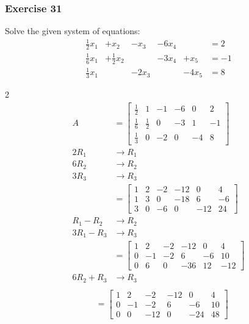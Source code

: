 \documentclass{math}
\begin{document}
\subsubsection*{Exercise 31}
Solve the given system of equations:
\[ \begin{alignedat}{4}
  \frac{1}{2}x_1 &+x_2 &-x_3 &-6x_4 & &= 2 \\
  \frac{1}{6}x_1 &+\frac{1}{2}x_2 & &-3x_4 &+x_5 &= -1 \\
  \frac{1}{3}x_1 & &-2x_3 & &-4x_5 &= 8
\end{alignedat} \]
\newpage
\begingroup
\renewcommand*{\arraystretch}{1.5}
\begin{multicols}{2}
  \begin{align*}
    A &= \begin{bmatrix}
      \frac{1}{2} & 1 & -1 & -6 & 0 & 2 \\
      \frac{1}{6} & \frac{1}{2} & 0 & -3 & 1 & -1 \\
      \frac{1}{3} & 0 & -2 & 0 & -4 & 8
    \end{bmatrix} \\
    2R_1 &\to R_1 \\
    6R_2 &\to R_2 \\
    3R_3 &\to R_3 \\
    &= \begin{bmatrix}
      1 & 2 & -2 & -12 & 0 & 4 \\
      1 & 3 & 0 & -18 & 6 & -6 \\
      3 & 0 & -6 & 0 & -12 & 24
    \end{bmatrix} \\
    R_1-R_2 &\to R_2 \\
    3R_1-R_3 &\to R_3 \\
    &= \begin{bmatrix}
      1 & 2 & -2 & -12 & 0 & 4 \\
      0 & -1 & -2 & 6 & -6 & 10 \\
      0 & 6 & 0 & -36 & 12 & -12
    \end{bmatrix} \\
    6R_2+R_3 &\to R_3 \\
  \end{align*}
  \begin{align*}
    &= \begin{bmatrix}
      1 & 2 & -2 & -12 & 0 & 4 \\
      0 & -1 & -2 & 6 & -6 & 10 \\
      0 & 0 & -12 & 0 & -24 & 48
    \end{bmatrix} \\

\end{align*}
\end{multicols}
\end{document}

